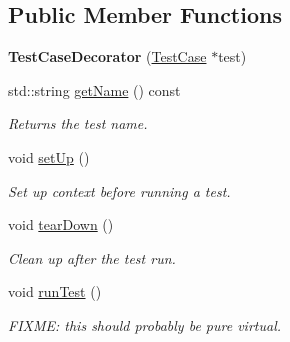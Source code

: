 \subsection*{Public Member Functions}
\begin{DoxyCompactItemize}
\item 
\hypertarget{class_test_case_decorator_ad324bf1dd0d660bae3eb5be8056e49e2}{{\bfseries Test\-Case\-Decorator} (\hyperlink{class_test_case}{Test\-Case} $\ast$test)}\label{class_test_case_decorator_ad324bf1dd0d660bae3eb5be8056e49e2}

\item 
std\-::string \hyperlink{class_test_case_decorator_a5214bb812414958d39f084e09c8af207}{get\-Name} () const 
\begin{DoxyCompactList}\small\item\em Returns the test name. \end{DoxyCompactList}\item 
\hypertarget{class_test_case_decorator_ae379c8f3e6d411d8a5da57094c08a623}{void \hyperlink{class_test_case_decorator_ae379c8f3e6d411d8a5da57094c08a623}{set\-Up} ()}\label{class_test_case_decorator_ae379c8f3e6d411d8a5da57094c08a623}

\begin{DoxyCompactList}\small\item\em Set up context before running a test. \end{DoxyCompactList}\item 
\hypertarget{class_test_case_decorator_adc3ee82fb758f39b5781624090af449d}{void \hyperlink{class_test_case_decorator_adc3ee82fb758f39b5781624090af449d}{tear\-Down} ()}\label{class_test_case_decorator_adc3ee82fb758f39b5781624090af449d}

\begin{DoxyCompactList}\small\item\em Clean up after the test run. \end{DoxyCompactList}\item 
\hypertarget{class_test_case_decorator_ad083ca55ff2e7f1f3f442364aa1dde66}{void \hyperlink{class_test_case_decorator_ad083ca55ff2e7f1f3f442364aa1dde66}{run\-Test} ()}\label{class_test_case_decorator_ad083ca55ff2e7f1f3f442364aa1dde66}

\begin{DoxyCompactList}\small\item\em F\-I\-X\-M\-E\-: this should probably be pure virtual. \end{DoxyCompactList}\end{DoxyCompactItemize}

